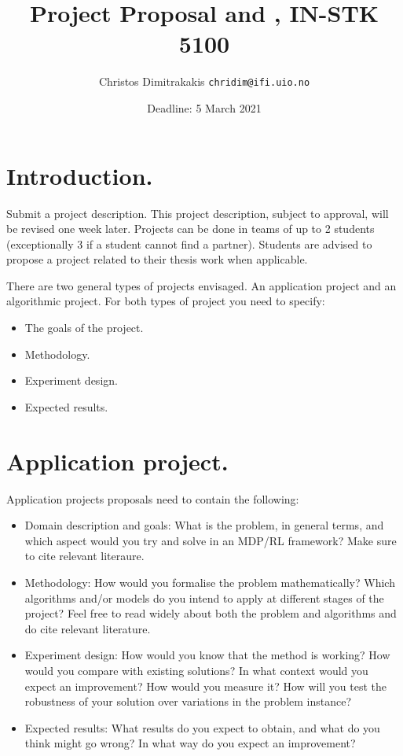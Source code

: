\documentclass[twoside,a4paper]{article}
\begin{document}
\title{Project Proposal and , IN-STK 5100}
\author{Christos Dimitrakakis  \texttt{chridim@ifi.uio.no}}
\date{Deadline: 5 March 2021}
\maketitle

\section{Introduction.}
Submit a project description. This project description, subject to approval, will be revised one week later. Projects can be done in teams of up to 2 students (exceptionally 3 if a student cannot find a partner). Students are advised to propose a project related to their thesis work when applicable.

There are two general types of projects envisaged. An application project and an algorithmic project. For both types of project you need to specify:
\begin{itemize}
\item The goals of the project.
\item Methodology.
\item Experiment design.
\item Expected results.
\end{itemize}

\section{Application project.}
Application projects proposals need to contain the following:
\begin{itemize}
\item Domain description and goals: What is the problem, in general terms, and which aspect would you try and solve in an MDP/RL framework? Make sure to cite relevant literaure.
\item Methodology: How would you formalise the problem mathematically? Which algorithms and/or models do you intend to apply at different stages of the project? Feel free to read widely about both the problem and algorithms and do cite relevant literature.
\item Experiment design: How would you know that the method is working? How would you compare with existing solutions? In what context would you expect an improvement? How would you measure it? How will you test the robustness of your solution over variations in the problem instance?
\item Expected results: What results do you expect to obtain, and what do you think might go wrong? In what way do you expect an improvement?
\end{itemize}
\end{document}
